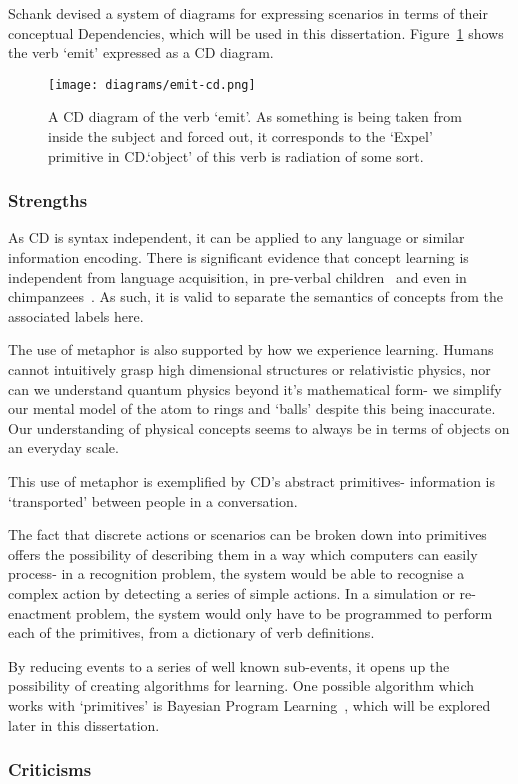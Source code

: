 \documentclass[dissertation.tex]{subfiles}
\begin{document}
    Schank devised a system of diagrams for expressing scenarios in terms of their conceptual Dependencies, which will be used in this dissertation. Figure~\ref{fig:emit-cd} shows the verb `emit' expressed as a CD diagram.
    \begin{figure}
        \centerline{
            \texttt{[image: diagrams/emit-cd.png]}
        }
        \caption{A CD diagram of the verb `emit'. As something is being taken from inside the subject and forced out, it corresponds to the `Expel' primitive in CD.\@The `object' of this verb is radiation of some sort.}\label{fig:emit-cd}
    \end{figure}

    \subsubsection{Strengths}
    As CD is syntax independent, it can be applied to any language or similar information encoding. There is significant evidence that concept learning is independent from language acquisition, in pre-verbal children~\cite{mandler-canovas2014imageschemas} and even in chimpanzees~\cite{Dahl-Adachi2013chimpanzees}. As such, it is valid to separate the semantics of concepts from the associated labels here.

    The use of metaphor is also supported by how we experience learning. Humans cannot intuitively grasp high dimensional structures or relativistic physics, nor can we understand quantum physics beyond it's mathematical form- we simplify our mental model of the atom to rings and `balls' despite this being inaccurate. Our understanding of physical concepts seems to always be in terms of objects on an everyday scale.

    This use of metaphor is exemplified by CD's abstract primitives- information is `transported' between people in a conversation.

    The fact that discrete actions or scenarios can be broken down into primitives offers the possibility of describing them in a way which computers can easily process- in a recognition problem, the system would be able to recognise a complex action by detecting a series of simple actions. In a simulation or re-enactment problem, the system would only have to be programmed to perform each of the primitives, from a dictionary of verb definitions.

    By reducing events to a series of well known sub-events, it opens up the possibility of creating algorithms for learning. One possible algorithm which works with `primitives' is Bayesian Program Learning~\cite{one-shot-learning}, which will be explored later in this dissertation. %

    \subsubsection{Criticisms}

\end{document}
